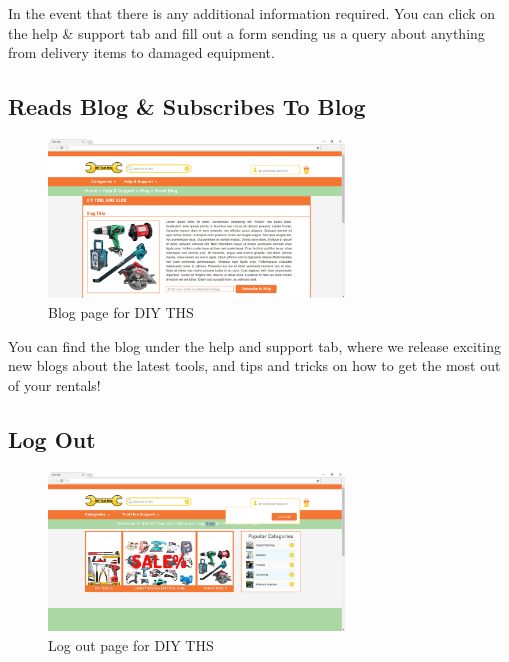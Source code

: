 In the event that there is any additional information required. You can
click on the help \& support tab and fill out a form sending us a query
about anything from delivery items to damaged equipment.

\hypertarget{reads-blog-subscribes-to-blog}{%
\subsection{Reads Blog \& Subscribes To
Blog}\label{reads-blog-subscribes-to-blog}}

\begin{figure}[H]
      \centering
      \includegraphics[trim = 0 0 0 0, clip, width=0.7\textwidth]{TempImg/readsblog.png}
      \caption{Blog page for DIY THS}
 \end{figure}

You can find the blog under the help and support tab, where we release
exciting new blogs about the latest tools, and tips and tricks on how to
get the most out of your rentals!

\hypertarget{log-out}{%
\subsection{Log Out}\label{log-out}}

\begin{figure}[H]
      \centering
      \includegraphics[trim = 0 0 0 0, clip, width=0.7\textwidth]{TempImg/logout_screen.jpg}
      \caption{Log out page for DIY THS}
 \end{figure}

